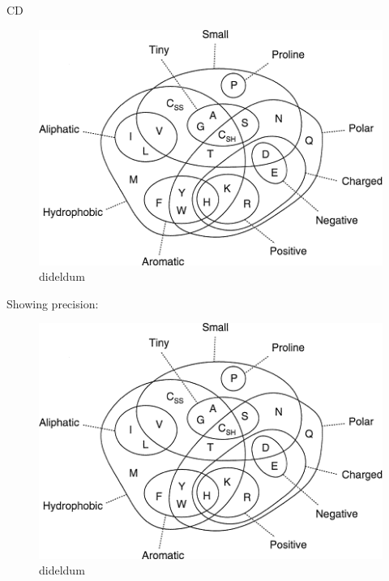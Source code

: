 \documentclass[11pt,a4paper,twoside]{book}
\theoremstyle{definition}
\theoremstyle{definition}
\theoremstyle{remark}
\begin{document}
CD

\begin{figure}

{\centering \includegraphics[width=1\linewidth]{img/aa_venn_diagram} 

}

\caption{dideldum}\label{fig:contact-map-1c75a00-cd}
\end{figure}

Showing precision:

\begin{figure}

{\centering \includegraphics[width=1\linewidth]{img/aa_venn_diagram} 

}

\caption{dideldum}\label{fig:precision-vs-rank-1c75a00}
\end{figure}
\end{document}

